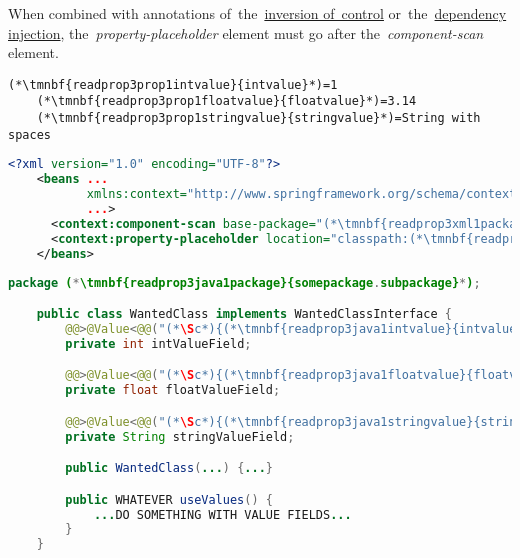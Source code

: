 \warning When combined with annotations of~the~\hyperref[iocannotations]{inversion of~control} or~the~\hyperref[autowiring]{dependency injection}, the~\textit{property-placeholder} element must go after the~\textit{component-scan} element.

\emtwen
\example
\begin{lstlisting}[title={A \textit{properties} file called \tmnbf{readprop3prop1filename}{\textit{annotations.properties}}}]
    (*\tmnbf{readprop3prop1intvalue}{intvalue}*)=1
    (*\tmnbf{readprop3prop1floatvalue}{floatvalue}*)=3.14
    (*\tmnbf{readprop3prop1stringvalue}{stringvalue}*)=String with spaces
\end{lstlisting}
\begin{lstlisting}[language=XML, title={Configuration XML}]
    <?xml version="1.0" encoding="UTF-8"?>
    <beans ...
           xmlns:context="http://www.springframework.org/schema/context"
           ...>
      <context:component-scan base-package="(*\tmnbf{readprop3xml1package}{somepackage.subpackage}[ForestGreen]*)"/>
      <context:property-placeholder location="classpath:(*\tmnbf{readprop3xml1filename}{annotations.properties}[ForestGreen]*)" file-encoding="utf-8"/>
    </beans>
\end{lstlisting}
\begin{lstlisting}[language=Java, title={Wanted class with any constructor}]
    package (*\tmnbf{readprop3java1package}{somepackage.subpackage}*);

    public class WantedClass implements WantedClassInterface {
        @@>@Value<@@("(*\Sc*){(*\tmnbf{readprop3java1intvalue}{intvalue}[ForestGreen]*)}")
        private int intValueField;

        @@>@Value<@@("(*\Sc*){(*\tmnbf{readprop3java1floatvalue}{floatvalue}[ForestGreen]*)}")
        private float floatValueField;

        @@>@Value<@@("(*\Sc*){(*\tmnbf{readprop3java1stringvalue}{stringvalue}[ForestGreen]*)}")
        private String stringValueField;

        public WantedClass(...) {...}

        public WHATEVER useValues() {
            ...DO SOMETHING WITH VALUE FIELDS...
        }
    }
\end{lstlisting}
\newpage

